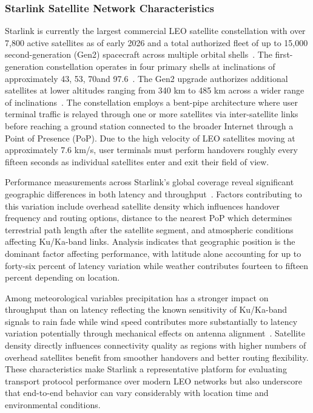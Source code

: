 \subsubsection{Starlink Satellite Network Characteristics}
Starlink is currently the largest commercial LEO satellite constellation with over 7,800 active satellites as of early 2026 and a total authorized fleet of up to 15,000 second-generation (Gen2) spacecraft across multiple orbital shells~\citep{Benghe2026,SpaceXFCC2026}. The first-generation constellation operates in four primary shells at inclinations of approximately 43\textdegree, 53\textdegree, 70\textdegree and 97.6\textdegree~\citep{Benghe2026}. The Gen2 upgrade authorizes additional satellites at lower altitudes ranging from 340 km to 485 km across a wider range of inclinations~\citep{SpaceXFCC2026}. The constellation employs a bent-pipe architecture where user terminal traffic is relayed through one or more satellites via inter-satellite links before reaching a ground station connected to the broader Internet through a Point of Presence (PoP). Due to the high velocity of LEO satellites moving at approximately 7.6 km/s, user terminals must perform handovers roughly every fifteen seconds as individual satellites enter and exit their field of view.
\par
Performance measurements across Starlink's global coverage reveal significant geographic differences in both latency and throughput~\citep{Benghe2026}. Factors contributing to this variation include overhead satellite density which influences handover frequency and routing options, distance to the nearest PoP which determines terrestrial path length after the satellite segment, and atmospheric conditions affecting Ku/Ka-band links. Analysis indicates that geographic position is the dominant factor affecting performance, with latitude alone accounting for up to forty-six percent of latency variation while weather  contributes fourteen to fifteen percent depending on location.
\par
Among meteorological variables precipitation has a stronger impact on throughput than on latency reflecting the known sensitivity of Ku/Ka-band signals to rain fade while wind speed contributes more substantially to latency variation potentially through mechanical effects on antenna alignment~\citep{Benghe2026}. Satellite density directly influences connectivity quality as regions with higher numbers of overhead satellites benefit from smoother handovers and better routing flexibility. These characteristics make Starlink a representative platform for evaluating transport protocol performance over modern LEO networks but also underscore that end-to-end behavior can vary considerably with location time and environmental conditions.
